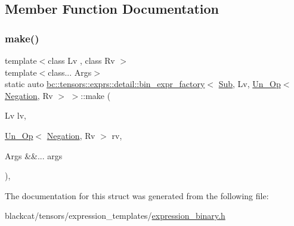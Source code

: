 \subsection{Member Function Documentation}
\mbox{\label{structbc_1_1tensors_1_1exprs_1_1detail_1_1bin__expr__factory_3_01Sub_00_01Lv_00_01Un__Op_3_01Negation_00_01Rv_01_4_01_4_af5b947051f47ac53f36b8b0e07708c50}} 
\subsubsection{\texorpdfstring{make()}{make()}}
{\footnotesize\ttfamily template$<$class Lv , class Rv $>$ \\
template$<$class... Args$>$ \\
static auto \hyperlink{structbc_1_1tensors_1_1exprs_1_1detail_1_1bin__expr__factory}{bc\+::tensors\+::exprs\+::detail\+::bin\+\_\+expr\+\_\+factory}$<$ \hyperlink{structbc_1_1oper_1_1Sub}{Sub}, Lv, \hyperlink{structbc_1_1tensors_1_1exprs_1_1Un__Op}{Un\+\_\+\+Op}$<$ \hyperlink{structbc_1_1oper_1_1Negation}{Negation}, Rv $>$ $>$\+::make (\begin{DoxyParamCaption}\item[{Lv}]{lv,  }\item[{\hyperlink{structbc_1_1tensors_1_1exprs_1_1Un__Op}{Un\+\_\+\+Op}$<$ \hyperlink{structbc_1_1oper_1_1Negation}{Negation}, Rv $>$}]{rv,  }\item[{Args \&\&...}]{args }\end{DoxyParamCaption})\hspace{0.3cm}{\ttfamily [inline]}, {\ttfamily [static]}}



The documentation for this struct was generated from the following file\+:\begin{DoxyCompactItemize}
\item 
blackcat/tensors/expression\+\_\+templates/\hyperlink{expression__binary_8h}{expression\+\_\+binary.\+h}\end{DoxyCompactItemize}

